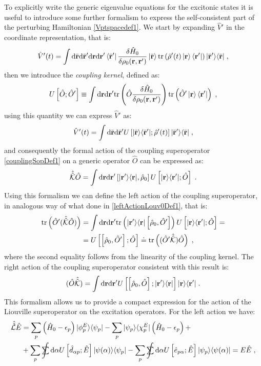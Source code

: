 \documentclass[a4paper]{article}
\newcommand{\dd}{{\rm d}}
\renewcommand{\r}{{\bf r}}
\newcommand{\br}{\bar{\bf r}}
\newcommand{\eps}{\epsilon}
\newcommand{\sint}{\mathrlap{\displaystyle\int}
\mathrlap{\textstyle\sum}
\phantom{\mathrlap{\displaystyle
\int}\textstyle\sum}}
\newcommand{\be}{\begin{equation}}
\newcommand{\ee}{\end{equation}}
\newcommand{\nn}{\notag}
\newcommand{\lb}{\label}
\newcommand{\op}[1]{\hat {#1}}
\newcommand{\sop}[1]{\op{\op {#1}}}
\newcommand{\commutator}[2]{\left[ {#1} , {#2} \right]}
\newcommand{\trace}[1]{\mathrm{tr}\left(#1\right)}
\newcommand{\ketbra}[2]{| #1 \rangle \langle #2 |}
\newcommand{\dmnot}{\op{\rho}_0}
\newcommand{\dm}{\op{\rho}}
\newcommand{\hnot}{\op{H}_0}
\newcommand{\excite}[2]{\op e_{{#1}{#2}}}
\newcommand{\decay}[2]{\op d_{{#1}{#2}}}
\newcommand{\Liouv}{\sop{\mathcal L}}
\newcommand{\coupl}{\sop{\mathcal K}}
\begin{document}
To explicitly write the generic eigenvalue equations for the excitonic states it is useful to introduce some further formalism to express the 
self-consistent part of the perturbing Hamiltonian \eqref{Vptspacedef1}. We start by expanding $\op V'$ in the coordinate representation, that is:
\be
\op V'(t)= 
\int \dd \br \dd \br' \dd \r \dd \r' \bra{\br'}\frac{\delta\hnot}{\delta \rho_0(\r,\r')}\ket{\br}
\trace{\dm'(t) \ket{\r} \bra{\r'}} \ketbra{\br'}{\br}\;, \nn
\ee
then we introduce the \emph{coupling kernel}, defined as:
\be\lb{couplingKernelDef1}
U\left[\op O; \op O'\right] \equiv  \int \dd \r \dd \r' \trace{\op O \frac{\delta \hnot }{\delta \rho_0(\r,\r')}
} \trace{\op O' \ket{\r} \bra{\r'}} \;,
\ee
using this quantity we can express $\op V'$ as:
\be\lb{Vptspacedef2}
\op V'(t)= 
\int \dd \br \dd \br' U\left[\ketbra{\br}{\br'};\dm'(t)\right] \ketbra{\br'}{\br}\;,
\ee
and consequently the formal action of the coupling superoperator \eqref{couplingSopDef1} on a generic operator $\op O$ can be expressed as: 
\be\lb{couplingSopDef2}
\coupl\op O = 
\int \dd \r \dd \r' \commutator{\ketbra{\r'}{\r}}{\dmnot} U\left[\ketbra{\r}{\r'};\op O\right] \;.
\ee
Using this formalism we can define the left action of the coupling superoperator, in analogous way of what done in \eqref{leftActionLouv0Def1}, 
that is:
\begin{align}\lb{leftActionCouplingDef1}
\trace{\op O' (\coupl \op O)} &= \int \dd\r\dd\r'\trace{\ketbra{\r'}{\r}\commutator{\dmnot}{\op O'}}
U\left[\ketbra{\r}{\r'};\op O\right]  = \nn \\ &= 
U\left[\commutator{\dmnot}{\op O'};\op O\right] \doteq \trace{(\op O' \coupl) \op O } \;,
\end{align}
where the second equality follows from the linearity of the coupling kernel. The right action of the coupling superoperator consistent with this result is:
\be\lb{leftActionCouplingDef2}
(\op O \coupl) = \int \dd\r\dd\r'
U\left[\commutator{\dmnot}{\op O};\ketbra{\r'}{\r}\right]\ketbra{\r}{\r'} \;.
\ee
This formalism allows us to provide a compact expression for the action of the Liouville superoperator on the excitation operators. For the left action we have:
\begin{align}
\Liouv\op E &= \sum_p\left(\hnot-\eps_p\right)\ketbra{\phi^E_p}{\psi_p} - \sum_p\ketbra{\psi_p}{\chi^E_p}\left(\hnot-\eps_p\right) + \nn \\
&+ \sum_p \sint \dd\alpha  U\left[\decay{\alpha}{p}; \op E\right] \ketbra{\psi(\alpha)}{\psi_p}
- \sum_p \sint \dd\alpha U\left[\excite{p}{\alpha}; \op E\right] \ketbra{\psi_p}{\psi(\alpha)} = E\op E \;, \nn
\end{align}
\end{document}
